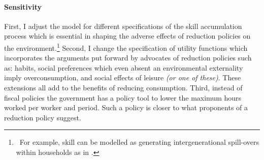 \paragraph{Sensitivity}
First, I adjust the model for different specifications of the skill accumulation process which is essential in shaping the adverse effects of reduction policies on the environment.\footnote{\ For example, skill can be modelled as generating intergenerational spill-overs within households as in \cite{Borissov2019CarbonDevelopment}.} Second, I change the specification of utility functions which incorporates the arguments put forward by advocates of reduction policies such as: habits, social preferences which even absent an environmental externality imply overconsumption, and social effects of leisure \textit{(or one of these)}.  These extensions all add to the benefits of reducing consumption. Third, instead of fiscal policies the government has a policy tool to lower the maximum hours worked per worker and period. Such a policy is closer to what proponents of a reduction policy suggest. %

